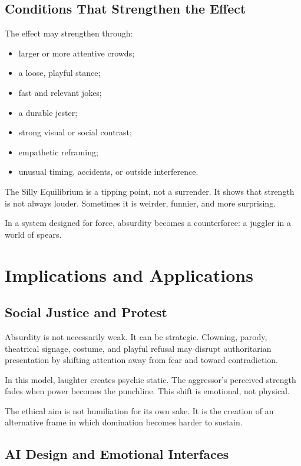\documentclass[11pt]{article}
\begin{document}
\subsection{Conditions That Strengthen the Effect}

The effect may strengthen through:

\begin{itemize}
\item larger or more attentive crowds;
\item a loose, playful stance;
\item fast and relevant jokes;
\item a durable jester;
\item strong visual or social contrast;
\item empathetic reframing;
\item unusual timing, accidents, or outside interference.
\end{itemize}

The Silly Equilibrium is a tipping point, not a surrender. It shows that strength is not always louder. Sometimes it is weirder, funnier, and more surprising.

In a system designed for force, absurdity becomes a counterforce: a juggler in a world of spears.

\section{Implications and Applications}

\subsection{Social Justice and Protest}

Absurdity is not necessarily weak. It can be strategic. Clowning, parody, theatrical signage, costume, and playful refusal may disrupt authoritarian presentation by shifting attention away from fear and toward contradiction.

In this model, laughter creates psychic static. The aggressor's perceived strength fades when power becomes the punchline. This shift is emotional, not physical.

The ethical aim is not humiliation for its own sake. It is the creation of an alternative frame in which domination becomes harder to sustain.

\subsection{AI Design and Emotional Interfaces}
\end{document}
